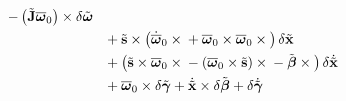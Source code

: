 \documentclass[10pt,dvips,fleqn,subeqn]{report}
\newcommand{\T}[1]{\bm{\mathbf{#1}}}
\newcommand{\TT}[1]{\bm{\mathbf{#1}}}
\begin{document}
\begin{subequations}
\begin{align}
{		- \plbr{\tilde{\TT{J}} \overline{\T{\omega}}_0} \times{}
	} \delta\tilde{\T{\omega}}
	\nonumber \\
	&\hphantom{=}
	+ \tilde{\T{s}} \times \plbr{
		\dot{\overline{\T{\omega}}}_0 \times{}
		+ \overline{\T{\omega}}_0 \times \overline{\T{\omega}}_0 \times{}
	} \delta\tilde{\T{x}}
	\nonumber \\
	&\hphantom{=}
	+ \plbr{
		\tilde{\T{s}} \times \overline{\T{\omega}}_0 \times{}
		- \plbr{\overline{\T{\omega}}_0 \times \tilde{\T{s}}} \times{}
		- \tilde{\T{\beta}} \times{}
	} \delta\dot{\tilde{\T{x}}}
	\nonumber \\
	&\hphantom{=}
	+ \overline{\T{\omega}}_0 \times \delta\tilde{\T{\gamma}}
	+ \dot{\tilde{\T{x}}} \times \delta\tilde{\T{\beta}}
	+ \delta\dot{\tilde{\T{\gamma}}}
\end{align}
\end{subequations}
\end{document}
